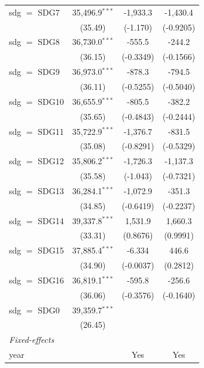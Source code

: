 \begin{tabular}{lccc}
   sdg $=$ SDG7  & 35,496.9$^{***}$  & -1,933.3          & -1,430.4\\   
                 & (35.49)           & (-1.170)          & (-0.9205)\\   
   sdg $=$ SDG8  & 36,730.0$^{***}$  & -555.5            & -244.2\\   
                 & (36.15)           & (-0.3349)         & (-0.1566)\\   
   sdg $=$ SDG9  & 36,973.0$^{***}$  & -878.3            & -794.5\\   
                 & (36.11)           & (-0.5255)         & (-0.5040)\\   
   sdg $=$ SDG10 & 36,655.9$^{***}$  & -805.5            & -382.2\\   
                 & (35.65)           & (-0.4843)         & (-0.2444)\\   
   sdg $=$ SDG11 & 35,722.9$^{***}$  & -1,376.7          & -831.5\\   
                 & (35.08)           & (-0.8291)         & (-0.5329)\\   
   sdg $=$ SDG12 & 35,806.2$^{***}$  & -1,726.3          & -1,137.3\\   
                 & (35.58)           & (-1.043)          & (-0.7321)\\   
   sdg $=$ SDG13 & 36,284.1$^{***}$  & -1,072.9          & -351.3\\   
                 & (34.85)           & (-0.6419)         & (-0.2237)\\   
   sdg $=$ SDG14 & 39,337.8$^{***}$  & 1,531.9           & 1,660.3\\   
                 & (33.31)           & (0.8676)          & (0.9991)\\   
   sdg $=$ SDG15 & 37,885.4$^{***}$  & -6.334            & 446.6\\   
                 & (34.90)           & (-0.0037)         & (0.2812)\\   
   sdg $=$ SDG16 & 36,819.1$^{***}$  & -595.8            & -256.6\\   
                 & (36.06)           & (-0.3576)         & (-0.1640)\\   
   sdg $=$ SDG0  & 39,359.7$^{***}$  &                   &   \\   
                 & (26.45)           &                   &   \\   
   \midrule
   \emph{Fixed-effects}\\
   year          &                   & Yes               & Yes\\  

\end{tabular}
